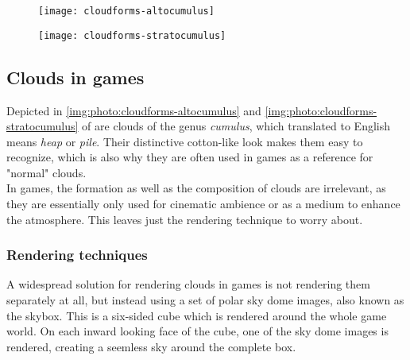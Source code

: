 \begin{figure}[ht]
    \centering
        \begin{minipage}{0.47\linewidth}
            \texttt{[image: cloudforms-altocumulus]}
            \label{img:photo:cloudforms-altocumulus}        
        \end{minipage}        
    \hfill
        \begin{minipage}{0.47\linewidth}
            \texttt{[image: cloudforms-stratocumulus]}
            \label{img:photo:cloudforms-stratocumulus}        
        \end{minipage}  
\end{figure}



\subsection{Clouds in games}
Depicted in \autoref{img:photo:cloudforms-altocumulus} and \autoref{img:photo:cloudforms-stratocumulus} of  are clouds of the genus \textit{cumulus}, which translated to English means \textit{heap} or \textit{pile}.
Their distinctive cotton-like look makes them easy to recognize, which is also why they are often used in games as a reference for "normal" clouds. 
\\
In games, the formation as well as the composition of clouds are irrelevant, as they are essentially only used for cinematic ambience or as a medium to enhance the atmosphere. This leaves just the rendering technique to worry about.

\subsubsection{Rendering techniques}
A widespread solution for rendering clouds in games is not rendering them separately at all, but instead using a set of polar sky dome images, also known as the skybox. This is a six-sided cube which is rendered around the whole game world. On each inward looking face of the cube, one of the sky dome images is rendered, creating a seemless sky around the complete box.

